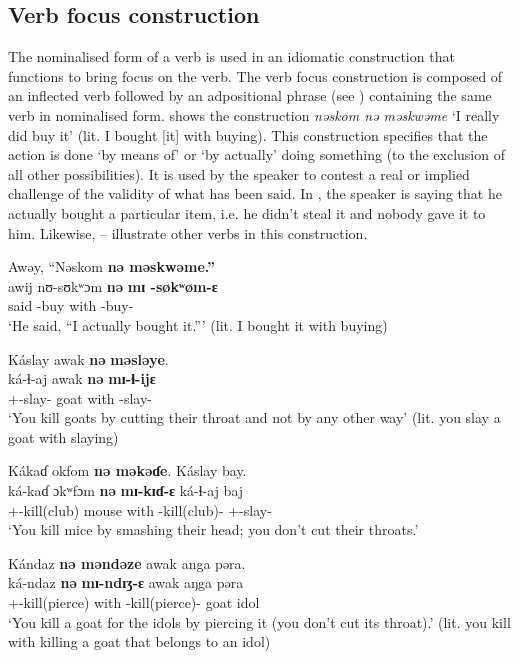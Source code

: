\subsection{Verb focus construction}\label{sec:7.6.3}
\hypertarget{RefHeading1212461525720847}{}
The nominalised form of a verb is used in an idiomatic construction that functions to bring focus on the verb. The verb focus construction is composed of an inflected verb followed by an adpositional phrase (see ) containing the same verb in nominalised form.  shows the construction \textit{nəskom  nə məskwəme} ‘I really did buy it’ (lit. I bought [it] with buying). This construction specifies that the action is done ‘by means of’ or ‘by actually’ doing something (to the exclusion of all other possibilities).  It is used by the speaker to contest a real or implied challenge of the validity of what has been said. In , the speaker is saying that he actually bought a particular item, i.e. he didn’t steal it and nobody gave it to him. Likewise, -- illustrate other verbs in this construction. 

\ea \label{ex:7:167}
Awəy,  “Nəskom \textbf{nə  məskwəme.”}\\
\gll awij   nʊ-sʊkʷɔm \textbf{nə}   \textbf{mɪ -søkʷøm-ɛ}\\
     said  {\oneS}-buy    with  {\NOM}{}-buy-{\CL}\\
\glt ‘He said, “I actually bought it.”’ (lit. I bought it with buying) 
\z

\ea \label{ex:7:168}
Káslay  awak \textbf{nə} \textbf{məsləye}.\\
\gll ká-ɬ{}-aj awak \textbf{nə} \textbf{mɪ-ɬ{}-ijɛ}\\
{\twoS}+{\IFV}-slay{}-{\CL}  goat  with  {\NOM}{}-slay-{\CL}\\
\glt ‘You kill goats by cutting their throat and not by any other way’ (lit. you slay a goat with slaying)
\z

\ea \label{ex:7:169}
Kákaɗ  okfom \textbf{nə  məkəɗe}.  Káslay  bay.\\
\gll ká-kaɗ  ɔkʷfɔm \textbf{nə}  \textbf{mɪ-kɪɗ-ɛ} ká-ɬ{}-aj    baj\\
{\twoS}+{\IFV}-kill(club)  mouse  with  {\NOM}{}-kill(club)-{\CL}  {\twoS}+{\IFV}-slay-{\CL}  {\NEG}\\
\glt ‘You kill mice by smashing their head; you don’t cut their throats.’  
\z

\ea \label{ex:7:170}
Kándaz \textbf{nə  məndəze} awak  anga  pəra.\\
\gll ká-ndaz \textbf{nə}  \textbf{mɪ-ndɪʒ-ɛ} awak aŋga pəra\\
{\twoS}+{\IFV}-kill(pierce)  with  {\NOM}{}-kill(pierce)-{\CL}  goat  {\POSS}  idol\\
\glt ‘You kill a goat for the idols by piercing it (you don’t cut its throat).’ (lit. you kill with killing a goat that belongs to an idol)
\z
{}
